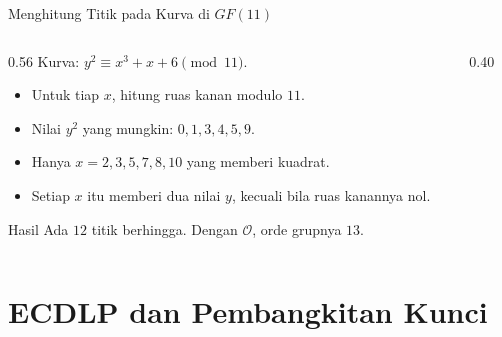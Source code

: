 \documentclass[aspectratio=169,11pt]{beamer}
\begin{document}
\begin{frame}{Menghitung Titik pada Kurva di $GF(11)$}
    \begin{columns}[T,onlytextwidth]
        \begin{column}{0.56\textwidth}
            \footnotesize
            Kurva: $y^2 \equiv x^3 + x + 6 \pmod{11}$.
            \begin{itemize}
                \item Untuk tiap $x$, hitung ruas kanan modulo $11$.
                \item Nilai $y^2$ yang mungkin: $0,1,3,4,5,9$.
                \item Hanya $x=2,3,5,7,8,10$ yang memberi kuadrat.
                \item Setiap $x$ itu memberi dua nilai $y$, kecuali bila
                      ruas kanannya nol.
            \end{itemize}
            \begin{exampleblock}{Hasil}
                \footnotesize
                Ada $12$ titik berhingga. Dengan $\mathcal{O}$, orde grupnya
                $13$.
            \end{exampleblock}
        \end{column}
        \begin{column}{0.40\textwidth}
            \centering
        \end{column}
    \end{columns}
\end{frame}

\section{ECDLP dan Pembangkitan Kunci}
\end{document}

